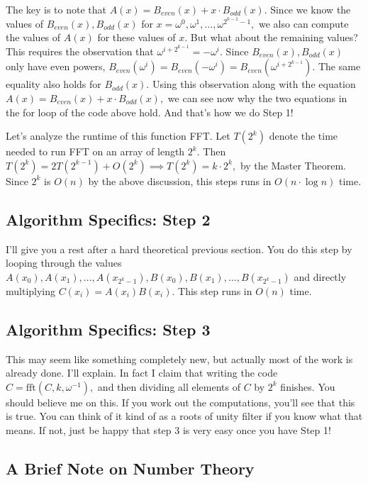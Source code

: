 The key is to note that $A(x) = B_{even}(x) + x \cdot B_{odd}(x).$ Since we know the values of $B_{even}(x), B_{odd}(x)$ for $x = \omega^0, \omega^1, \dots, \omega^{2^{k-1}-1},$ we also can compute the values of $A(x)$ for these values of $x$. But what about the remaining values? This requires the observation that $\omega^{i + 2^{k-1}} = -\omega^i.$ Since $B_{even}(x), B_{odd}(x)$ only have even powers, $B_{even}(\omega^i) = B_{even}(-\omega^i) = B_{even}(\omega^{i + 2^{k-1}}).$ The same equality also holds for $B_{odd}(x).$ Using this observation along with the equation $A(x) = B_{even}(x) + x \cdot B_{odd}(x),$ we can see now why the two equations in the for loop of the code above hold. And that's how we do Step 1!

Let's analyze the runtime of this function FFT. Let $T(2^k)$ denote the time needed to run FFT on an array of length $2^k.$ Then $T(2^k) = 2T(2^{k-1}) + O(2^k) \implies T(2^k) = k \cdot 2^k,$ by the Master Theorem. Since $2^k$ is $O(n)$ by the above discussion, this steps runs in $O(n \cdot \log n)$ time.

\subsection{Algorithm Specifics: Step 2}

I'll give you a rest after a hard theoretical previous section. You do this step by looping through the values $A(x_0), A(x_1), \dots, A(x_{2^k-1}), B(x_0), B(x_1), \dots, B(x_{2^k-1})$ and directly multiplying $C(x_i) = A(x_i)B(x_i).$ This step runs in $O(n)$ time.

\subsection{Algorithm Specifics: Step 3}

This may seem like something completely new, but actually most of the work is already done. I'll explain. In fact I claim that writing the code $C = \text{fft}(C, k, \omega^{-1}),$ and then dividing all elements of $C$ by $2^k$ finishes. You should believe me on this. If you work out the computations, you'll see that this is true. You can think of it kind of as a roots of unity filter if you know what that means. If not, just be happy that step 3 is very easy once you have Step 1!

\subsection{A Brief Note on Number Theory}


